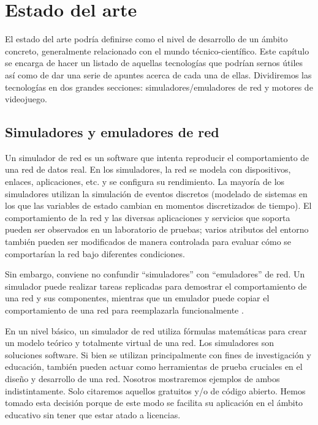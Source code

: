 \chapter{Estado del arte}\label{chap:ArtState}

El estado del arte podría definirse como el nivel de desarrollo de un ámbito concreto, generalmente relacionado con el mundo técnico-científico. Este capítulo se encarga de hacer un listado de aquellas tecnologías que podrían sernos útiles así como de dar una serie de apuntes acerca de cada una de ellas. Dividiremos las tecnologías en dos grandes secciones: simuladores/emuladores de red y motores de videojuego.

\section{Simuladores y emuladores de red}\label{sec:simuladoremulador}
Un simulador de red es un software que intenta reproducir el comportamiento de una red de datos real. En los simuladores, la red se modela con dispositivos, enlaces, aplicaciones, etc. y se configura su rendimiento. La mayoría de los simuladores utilizan la simulación de eventos discretos (modelado de sistemas en los que las variables de estado cambian en momentos discretizados de tiempo)\cite{wiki:Network_simulation}. El comportamiento de la red y las diversas aplicaciones y servicios que soporta pueden ser observados en un laboratorio de pruebas; varios atributos del entorno también pueden ser modificados de manera controlada para evaluar cómo se comportarían la red bajo diferentes condiciones.

Sin embargo, conviene no confundir ``simuladores'' con ``emuladores'' de red. Un simulador puede realizar tareas replicadas para demostrar el comportamiento de una red y sus componentes, mientras que un emulador puede copiar el comportamiento de una red para reemplazarla funcionalmente \cite{emsim}.

En un nivel básico, un simulador de red utiliza fórmulas matemáticas para crear un modelo teórico y totalmente virtual de una red. Los simuladores son soluciones software. Si bien se utilizan principalmente con fines de investigación y educación, también pueden actuar como herramientas de prueba cruciales en el diseño y desarrollo de una red. Nosotros mostraremos ejemplos de ambos indistintamente. Solo citaremos aquellos gratuitos y/o de código abierto. Hemos tomado esta decisión porque de este modo se facilita su aplicación en el ámbito educativo sin tener que estar atado a licencias.

